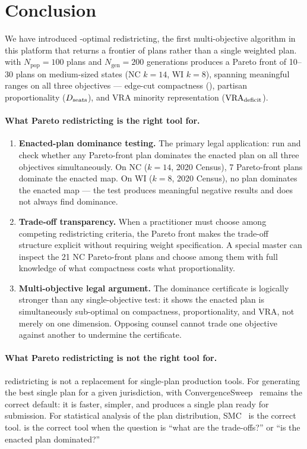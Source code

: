\section{Conclusion}
\label{sec:conclusion}

We have introduced \pareto{}-optimal redistricting, the first multi-objective
algorithm in this platform that returns a frontier of plans rather than a
single weighted plan.
\nsga{} with $N_{\mathrm{pop}} = 100$ plans and $N_{\mathrm{gen}} = 200$
generations produces a Pareto front of 10--30 plans on medium-sized states
(NC $k=14$, WI $k=8$), spanning meaningful ranges on all three objectives
--- edge-cut compactness (\EC{}), partisan proportionality ($D_{\mathrm{seats}}$), and
VRA minority representation ($\mathrm{VRA}_{\mathrm{deficit}}$).

\paragraph{What Pareto redistricting is the right tool for.}

\begin{enumerate}
\item \textbf{Enacted-plan dominance testing.}
  The primary legal application: run \nsga{} and check whether any
  Pareto-front plan dominates the enacted plan on all three objectives
  simultaneously.
  On NC ($k=14$, 2020 Census), 7 Pareto-front plans dominate the enacted map.
  On WI ($k=8$, 2020 Census), no plan dominates the enacted map --- the
  test produces meaningful negative results and does not always find
  dominance.

\item \textbf{Trade-off transparency.}
  When a practitioner must choose among competing redistricting criteria,
  the Pareto front makes the trade-off structure explicit without requiring
  weight specification.
  A special master can inspect the 21 NC Pareto-front plans and choose
  among them with full knowledge of what compactness costs what
  proportionality.

\item \textbf{Multi-objective legal argument.}
  The dominance certificate is logically stronger than any single-objective
  test: it shows the enacted plan is simultaneously sub-optimal on
  compactness, proportionality, and VRA, not merely on one dimension.
  Opposing counsel cannot trade one objective against another to undermine
  the certificate.
\end{enumerate}

\paragraph{What Pareto redistricting is not the right tool for.}
\nsga{} redistricting is not a replacement for single-plan production tools.
For generating the best single plan for a given jurisdiction, \metis{} with
ConvergenceSweep~\citep{dellaLibera2026comparison} remains the correct default:
it is faster, simpler, and produces a single plan ready for submission.
For statistical analysis of the plan distribution, SMC~\citep{dellaLibera2026smc}
is the correct tool.
\nsga{} is the correct tool when the question is ``what are the trade-offs?''
or ``is the enacted plan dominated?''

